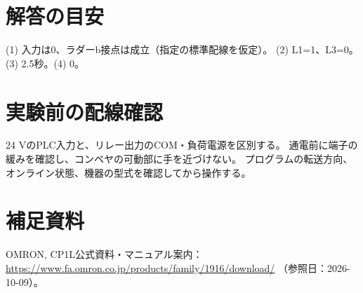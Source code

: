 \documentclass[lualatex,a4paper,10pt]{jlreq}
\begin{document}
\section*{解答の目安}\label{sec:auto9}
(1) 入力は0、ラダーb接点は成立（指定の標準配線を仮定）。
(2) L1=1、L3=0。(3) 2.5秒。(4) 0。
\section*{実験前の配線確認}\label{sec:auto10}
24 VのPLC入力と、リレー出力のCOM・負荷電源を区別する。
通電前に端子の緩みを確認し、コンベヤの可動部に手を近づけない。
プログラムの転送方向、オンライン状態、機器の型式を確認してから操作する。
\section*{補足資料}\label{sec:auto11}
OMRON, CP1L公式資料・マニュアル案内：
\url{https://www.fa.omron.co.jp/products/family/1916/download/}
（参照日：2026-10-09）。
\prelabclosing
\end{document}
